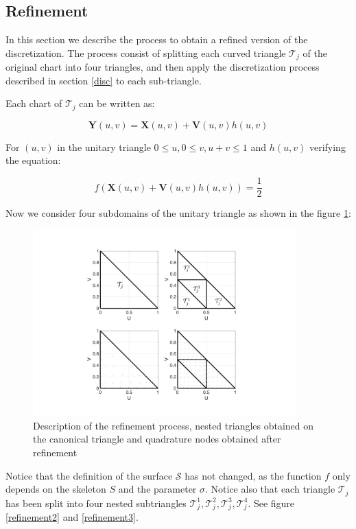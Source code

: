 \documentclass[11pt]{article}
\numberwithin{equation}{section}
\newcommand\bX{\boldsymbol X}
\newcommand\bY{\boldsymbol Y}
\newcommand\bV{\boldsymbol V}
\begin{document}
\subsection{Refinement}

In this section we describe the process to obtain a refined version of the discretization. The process consist of splitting each curved triangle  $\mathcal{T}_j$ of the original chart into four triangles, and then apply the discretization process described in section \ref{disc} to each sub-triangle.

Each chart of $\mathcal{T}_j$ can be written as:

\begin{equation}
\bY(u,v)=\bX(u,v)+\bV(u,v)h(u,v)
\end{equation}

For $(u,v)$ in the unitary triangle $0\le u, 0\le v, u+v\le1$ and $h(u,v)$ verifying the equation:

\begin{equation}
f(\bX(u,v)+\bV(u,v)h(u,v))=\frac{1}{2}
\end{equation}

Now we consider four subdomains of the unitary triangle as shown in the figure \ref{refinement1}:

\begin{figure}[H]
\begin{center}
\includegraphics[width=4in]{Triangle_Refine_v2.pdf}
\end{center}
\caption{Description of the refinement process, nested triangles obtained on the canonical triangle and quadrature nodes obtained after refinement}
\label{refinement1}
\end{figure}

Notice that the definition of the surface $\mathcal{S}$ has not changed, as the function $f$ only depends on the skeleton $\mathit{S}$ and the parameter $\sigma$. Notice also that each triangle $\mathcal{T}_j$ has been split into four nested subtriangles $\mathcal{T}_j^1,\mathcal{T}_j^2,\mathcal{T}_j^3,\mathcal{T}_j^4$. See figure \ref{refinement2} and \ref{refinement3}.
\end{document}

